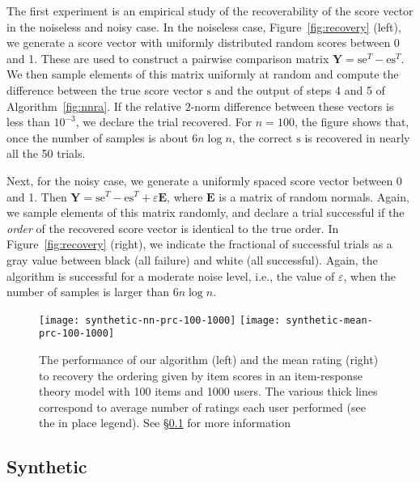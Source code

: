 \documentclass{sig-alternate}
\newcommand{\eps}{\varepsilon}
\newcommand{\mat}{\boldsymbol}
\renewcommand{\vec}[1]{\boldsymbol{\mathrm{#1}}}
\providecommand{\mE}{\ensuremath{\mat{E}}}
\providecommand{\mY}{\ensuremath{\mat{Y}}}
\providecommand{\ve}{\ensuremath{\vec{e}}}
\providecommand{\vs}{\ensuremath{\vec{s}}}
\begin{document}
The first experiment is an empirical study
of the recoverability of the score vector in
the noiseless and noisy case.  
In the noiseless case, Figure~\ref{fig:recovery} (left),
we generate
a score vector with uniformly distributed random scores between
0 and 1.  These are used to construct
a pairwise comparison matrix $\mY = \vs \ve^T - \ve \vs^T$.
We then sample elements of this matrix uniformly at
random and compute the difference between
the true score vector $\vs$ and the output of
steps 4 and 5 of Algorithm~\ref{fig:nnra}.  If the 
relative $2$-norm
difference between these vectors is less than $10^{-3}$,
we declare the trial recovered.  For 
$n=100$, the figure shows that, once
the number of samples is about $6n \log n$, 
the correct $\vs$ is recovered in nearly 
all the 50 trials.

Next, for the noisy case, we generate 
a uniformly spaced score vector between
0 and 1.  Then $\mY = \vs \ve^T - \ve \vs^T + \eps \mE$,
where $\mE$ is a matrix of random normals.  
Again, we sample elements of this matrix randomly,
and declare a trial successful if the \emph{order}
of the recovered score vector is identical
to the true order.  
In Figure~\ref{fig:recovery} (right),
we indicate the fractional of successful trials
as a gray value between black (all failure) 
and white (all successful).  Again, the algorithm
is successful for a moderate noise level, i.e.,
the value of $\eps$, when the number of samples
is larger than $6n \log n$.

\begin{figure}
\texttt{[image: synthetic-nn-prc-100-1000]}
\texttt{[image: synthetic-mean-prc-100-1000]}
\caption{The performance of our algorithm (left)
and the mean rating (right) to recovery
the ordering given by item scores 
in an item-response theory model
with 100 items and 1000 users.  
The various thick lines 
correspond to average number of ratings 
each user performed (see the in place legend).
See \S\ref{sec:synthetic} for more information}
\label{fig:synthetic}
\end{figure}

\subsection{Synthetic} \label{sec:synthetic}
\end{document}
